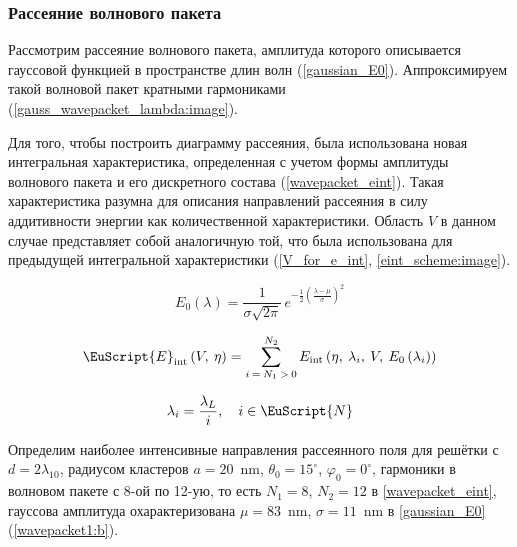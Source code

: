 \subsubsection{Рассеяние волнового пакета}

Рассмотрим рассеяние волнового пакета, амплитуда которого описывается гауссовой функцией в пространстве длин волн (\autoref{gaussian_E0}). Аппроксимируем такой волновой пакет кратными гармониками (\autoref{gauss_wavepacket_lambda:image}).


Для того, чтобы построить диаграмму рассеяния, была использована новая интегральная характеристика, определенная с учетом формы амплитуды волнового пакета и его дискретного состава (\autoref{wavepacket_eint}). Такая характеристика разумна для описания направлений рассеяния в силу аддитивности энергии как количественной характеристики. Область $V$ в данном случае представляет собой аналогичную той, что была использована для предыдущей интегральной характеристики (\autoref{V_for_e_int}, \autoref{eint_scheme:image}).


    \begin{equation}
        E_0 \left( \lambda \right) = \frac{1}{\sigma\sqrt{2\pi}}\,e^{-\frac{1}{2}{\left(\frac{\lambda - \mu}{\sigma}\right)}^2}\label{gaussian_E0}
    \end{equation}

    \begin{equation}
        \EuScript{E}_{\textrm{int}} \left(V, \:\eta\right) = \sum\limits_{i\:=\:N_1\:>\:0}^{N_2}{E_{\textrm{int}} \left( \eta,\:\lambda_{i}, \:V, \:E_0 \left( \lambda_{i} \right) \right)}
        \label{wavepacket_eint}
    \end{equation}

    \begin{equation*}
        \lambda_{i} = \frac{\lambda_{L}}{i}, \quad i \in \EuScript{N}\label{wavepacket_lambdas}
    \end{equation*}

Определим наиболее интенсивные направления рассеянного поля для решётки с $d = 2\lambda_{10}$, радиусом кластеров $a = 20$~nm, $\theta_0 = 15^\circ$, $\varphi_0 = 0^\circ$, гармоники в волновом пакете с 8-ой по 12-ую, то есть $N_1 = 8$, $N_2 = 12$ в \autoref{wavepacket_eint}, гауссова амплитуда охарактеризована $\mu = 83$~nm, $\sigma = 11$~nm в \autoref{gaussian_E0} (\autoref{wavepacket1:b}). 

